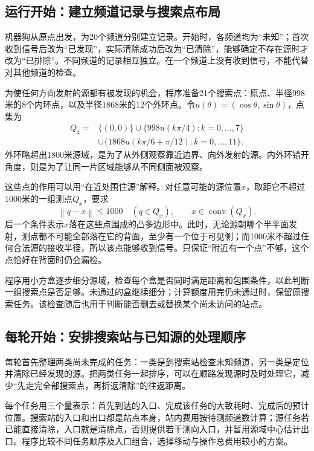 \documentclass[UTF8,a4paper,12pt,fontset=fandol]{ctexart}
\newcommand{\norm}[1]{\left\lVert#1\right\rVert}
\newcommand{\conv}{\operatorname{conv}}
\begin{document}
\subsection{运行开始：建立频道记录与搜索点布局}
机器狗从原点出发，为20个频道分别建立记录。开始时，各频道均为“未知”；首次收到信号后改为“已发现”，实际清除成功后改为“已清除”，能够确定不存在源时才改为“已排除”。不同频道的记录相互独立。在一个频道上没有收到信号，不能代替对其他频道的检查。

为使任何方向发射的源都有被发现的机会，程序准备21个搜索点：原点、半径998米的8个内环点，以及半径1868米的12个外环点。令$u(\theta)=(\cos\theta,\sin\theta)$，点集为
\begin{equation}\label{eq:q4stations}
\begin{split}
Q_4={}&\{(0,0)\}\cup\{998u(k\pi/4):k=0,\ldots,7\}\\
&\cup\{1868u(k\pi/6+\pi/12):k=0,\ldots,11\}.
\end{split}
\end{equation}
外环略超出1800米源域，是为了从外侧观察靠近边界、向外发射的源。内外环错开角度，则是为了让同一片区域能够从不同侧面被观察。

这些点的作用可以用“在近处围住源”解释。对任意可能的源位置$x$，取距它不超过1000米的一组测点$Q_x$，要求
\begin{equation}\label{eq:dircover}
\norm{q-x}\le1000\quad(q\in Q_x),\qquad x\in\conv(Q_x).
\end{equation}
后一个条件表示$x$落在这些点围成的凸多边形中。此时，无论源朝哪个半平面发射，测点都不可能全部落在它的背面，至少有一个位于可见侧；而1000米不超过任何合法源的接收半径，所以该点能够收到信号。只保证“附近有一个点”不够，这个点恰好在背面时仍会漏检。

程序用小方盒逐步细分源域，检查每个盒是否同时满足距离和包围条件，以此判断一组搜索点是否足够。未通过的盒继续细分；计算额度用完仍未通过时，保留原搜索任务。该检查随后也用于判断能否删去或替换某个尚未访问的站点。

\subsection{每轮开始：安排搜索站与已知源的处理顺序}
每轮首先整理两类尚未完成的任务：一类是到搜索站检查未知频道，另一类是定位并清除已经发现的源。把两类任务一起排序，可以在顺路发现源时及时处理它，减少“先走完全部搜索点，再折返清除”的往返距离。

每个任务用三个量表示：首先到达的入口、完成该任务的大致耗时、完成后的预计位置。搜索站的入口和出口都是站点本身，站内费用按待测频道数计算；源任务若已能直接清除，入口就是清除点，否则提供若干测向入口，并暂用源域中心估计出口。程序比较不同任务顺序及入口组合，选择移动与操作总费用较小的方案。
\end{document}
